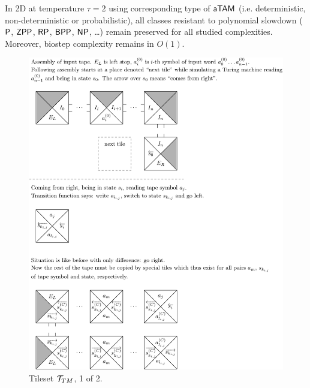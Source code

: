 	\begin{cor}
	\label{cor:poly_resist}
		
		In 2D at temperature $\tau = 2$ using corresponding type of $\atam$ (i.e. deterministic, non-deterministic or probabilistic), all classes resistant to polynomial slowdown ($\P$, $\ZPP$, $\RP$, $\BPP$, $\NP$, \ldots) remain preserved for all studied complexities. Moreover, biostep complexity remains in $O(1)$.
	\end{cor}
	
	\begin{figure}[h]
	\begin{center}
		\includegraphics{./figures/turing_tiles/out1-1.pdf}
		\caption{Tileset ${\cal T}_{TM}$, 1 of 2.}
		\label{fig:tileset1}
	\end{center}
	\end{figure}
	

